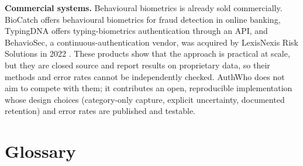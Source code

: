 \documentclass[10pt,letterpaper]{article}
\begin{document}
\textbf{Commercial systems.} Behavioural biometrics is already sold commercially. BioCatch offers behavioural biometrics for fraud detection in online banking, TypingDNA offers typing-biometrics authentication through an API, and BehavioSec, a continuous-authentication vendor, was acquired by LexisNexis Risk Solutions in 2022 \cite{behaviosec2022}. These products show that the approach is practical at scale, but they are closed source and report results on proprietary data, so their methods and error rates cannot be independently checked. AuthWho does not aim to compete with them; it contributes an open, reproducible implementation whose design choices (category-only capture, explicit uncertainty, documented retention) and error rates are published and testable.

\section*{Glossary}
\end{document}
